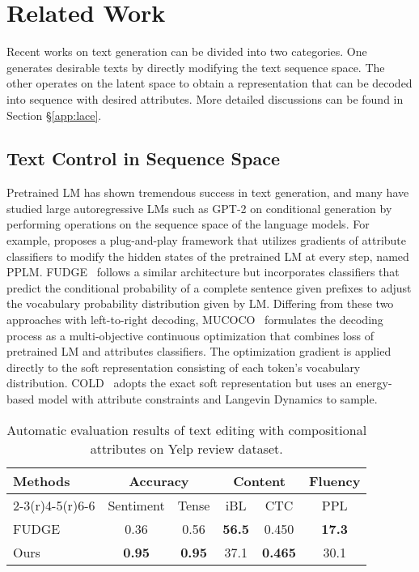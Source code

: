 \documentclass[11pt]{article}
\begin{document}
 \section{Related Work}
Recent works on text generation can be divided into two categories. One generates desirable texts by directly modifying the text sequence space. The other operates on the latent space to obtain a representation that can be decoded into sequence with desired attributes. More detailed discussions can be found in Section \S\ref{app:lace}.
\subsection{Text Control in Sequence Space}
Pretrained LM has shown tremendous success in text generation, and many have studied large autoregressive LMs such as GPT-2 on conditional generation by performing operations on the sequence space of the language models. For example, \citet{Dathathri2020Plug} proposes a plug-and-play framework that utilizes gradients of attribute classifiers to modify the hidden states of the pretrained LM at every step, named PPLM. 
FUDGE~\cite{DBLP:journals/corr/abs-2104-05218} follows a similar architecture but incorporates classifiers that predict the conditional probability of a complete sentence given prefixes to adjust the vocabulary probability distribution given by LM. Differing from these two approaches with left-to-right decoding, MUCOCO~\cite{DBLP:conf/nips/KumarMST21} formulates the decoding process as a multi-objective continuous optimization that combines loss of pretrained LM and attributes classifiers. The optimization gradient is applied directly to the soft representation consisting of each token's vocabulary distribution. COLD~\cite{QinCOLD} adopts the exact soft representation but uses an energy-based model with attribute constraints and Langevin Dynamics to sample. 
\begin{table}[t]
\setlength\tabcolsep{5.5pt}
    \scriptsize
    \centering
    \vspace{-15pt}
    \begin{tabular}{lccccc}
    \toprule
    \multirow{3}{*}{Methods} & \multicolumn{2}{c}{Accuracy} & \multicolumn{2}{c}{Content}  & Fluency\\\cmidrule(r){2-3}\cmidrule(r){4-5}\cmidrule(r){6-6}
    & Sentiment & Tense & iBL  &  CTC &PPL   \\
    \midrule
     FUDGE & 0.36  & 0.56  & \textbf{56.5}  & 0.450 & \textbf{17.3}\\
    Ours  & \textbf{0.95}  & \textbf{0.95}  & {37.1}& \textbf{0.465} & 30.1 \\\bottomrule
    \end{tabular}
\caption{Automatic evaluation results of text editing with compositional attributes on Yelp review dataset.}
    \label{tab:tst_multiple}
    \vspace{-10pt}
\end{table}
\end{document}
